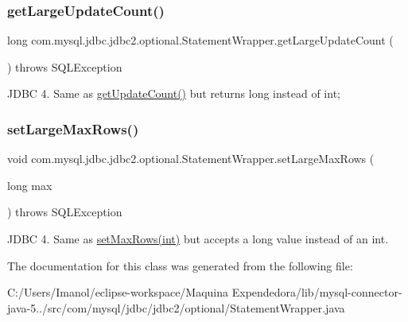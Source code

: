\subsubsection{\texorpdfstring{get\+Large\+Update\+Count()}{getLargeUpdateCount()}}
{\footnotesize\ttfamily long com.\+mysql.\+jdbc.\+jdbc2.\+optional.\+Statement\+Wrapper.\+get\+Large\+Update\+Count (\begin{DoxyParamCaption}{ }\end{DoxyParamCaption}) throws S\+Q\+L\+Exception}

J\+D\+BC 4. Same as \mbox{\hyperlink{}{get\+Update\+Count()}} but returns long instead of int; \mbox{\label{classcom_1_1mysql_1_1jdbc_1_1jdbc2_1_1optional_1_1_statement_wrapper_a788a8f9deda0587bfef126ec416e28e5}} 
\subsubsection{\texorpdfstring{set\+Large\+Max\+Rows()}{setLargeMaxRows()}}
{\footnotesize\ttfamily void com.\+mysql.\+jdbc.\+jdbc2.\+optional.\+Statement\+Wrapper.\+set\+Large\+Max\+Rows (\begin{DoxyParamCaption}\item[{long}]{max }\end{DoxyParamCaption}) throws S\+Q\+L\+Exception}

J\+D\+BC 4. Same as \mbox{\hyperlink{}{set\+Max\+Rows(int)}} but accepts a long value instead of an int. 

The documentation for this class was generated from the following file\+:\begin{DoxyCompactItemize}
\item 
C\+:/\+Users/\+Imanol/eclipse-\/workspace/\+Maquina Expendedora/lib/mysql-\/connector-\/java-\/5../src/com/mysql/jdbc/jdbc2/optional/Statement\+Wrapper.\+java\end{DoxyCompactItemize}
